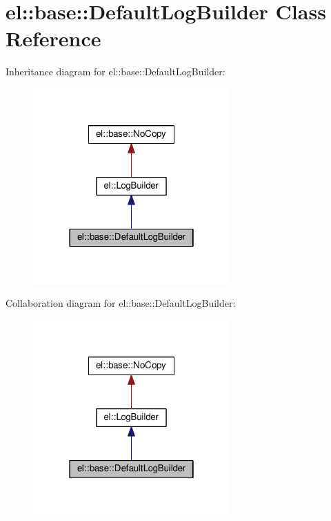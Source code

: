 \hypertarget{classel_1_1base_1_1_default_log_builder}{}\section{el\+:\+:base\+:\+:Default\+Log\+Builder Class Reference}
\label{classel_1_1base_1_1_default_log_builder}


Inheritance diagram for el\+:\+:base\+:\+:Default\+Log\+Builder\+:
\nopagebreak
\begin{figure}[H]
\begin{center}
\leavevmode
\includegraphics[width=214pt]{classel_1_1base_1_1_default_log_builder__inherit__graph}
\end{center}
\end{figure}


Collaboration diagram for el\+:\+:base\+:\+:Default\+Log\+Builder\+:
\nopagebreak
\begin{figure}[H]
\begin{center}
\leavevmode
\includegraphics[width=214pt]{classel_1_1base_1_1_default_log_builder__coll__graph}
\end{center}
\end{figure}
